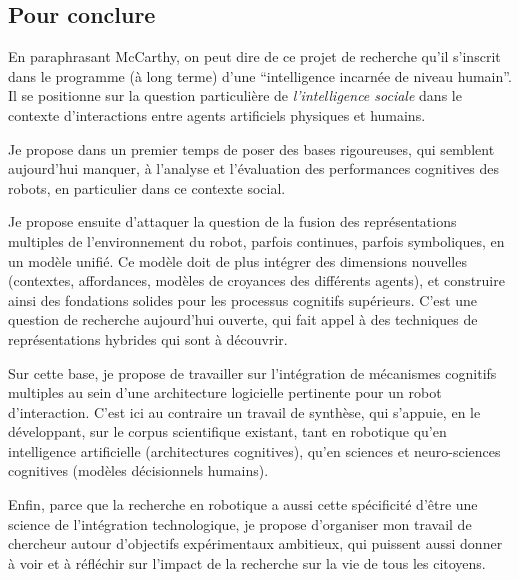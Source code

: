 \documentclass[a4paper]{article}
\begin{document}
\subsection{Pour conclure}

En paraphrasant McCarthy, on peut dire de ce projet de recherche qu'il s'inscrit
dans le programme (à long terme) d'une ``intelligence incarnée de niveau
humain''. Il se positionne sur la question particulière de \emph{l'intelligence
sociale} dans le contexte d'interactions entre agents artificiels physiques et
humains.

Je propose dans un premier temps de poser des bases rigoureuses, qui semblent
aujourd'hui manquer, à l'analyse et l'évaluation des performances cognitives des
robots, en particulier dans ce contexte social.

Je propose ensuite d'attaquer la question de la fusion des représentations
multiples de l'environnement du robot, parfois continues, parfois symboliques,
en un modèle unifié. Ce modèle doit de plus intégrer des dimensions nouvelles
(contextes, affordances, modèles de croyances des différents agents), et
construire ainsi des fondations solides pour les processus cognitifs supérieurs.
C'est une question de recherche aujourd'hui ouverte, qui fait appel à des
techniques de représentations hybrides qui sont à découvrir.

Sur cette base, je propose de travailler sur l'intégration de mécanismes
cognitifs multiples au sein d'une architecture logicielle pertinente pour un
robot d'interaction. C'est ici au contraire un travail de synthèse, qui
s'appuie, en le développant, sur le corpus scientifique existant, tant en
robotique qu'en intelligence artificielle (architectures cognitives), qu'en
sciences et neuro-sciences cognitives (modèles décisionnels humains).

Enfin, parce que la recherche en robotique a aussi cette spécificité d'être une
science de l'intégration technologique, je propose d'organiser mon travail de
chercheur autour d'objectifs expérimentaux ambitieux, qui puissent aussi donner
à voir et à réfléchir sur l'impact de la recherche sur la vie de tous les
citoyens.

\printbibliography
\end{document}
